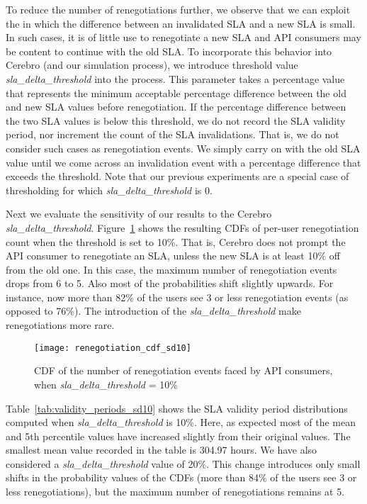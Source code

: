 To reduce the number of renegotiations further, we observe that we can exploit the
in which the difference between an invalidated SLA
and a new SLA is small.  In such cases, it is of little use to renegotiate 
a new SLA and API consumers may be content to continue with the old SLA.
To incorporate this behavior into Cerebro (and our simulation process), we introduce threshold
value \textit{sla\_delta\_threshold} into the process. This parameter takes a percentage value that
represents the minimum acceptable percentage difference between the old and new SLA 
values before renegotiation.
If the percentage difference between the two SLA values is below this threshold, we do not record the
SLA validity period, nor increment the count of the SLA invalidations. That is, we do not consider
such cases as renegotiation events. We simply carry on with the
old SLA value until we come across an invalidation event with a percentage difference
that exceeds the threshold. 
Note that our previous experiments are 
a special case of thresholding for which \textit{sla\_delta\_threshold} is 0.

Next we evaluate the sensitivity of our results to the Cerebro \textit{sla\_delta\_threshold}.
Figure~\ref{fig:renegotiation_cdf_sd10}
shows the resulting CDFs of per-user renegotiation count when the threshold is set to 10\%. That is, Cerebro does not prompt the API consumer to renegotiate an SLA, unless the new SLA is at 
least 10\% off from the old one. In this case, the
maximum number of renegotiation events drops from 6 to 5.
Also most of the probabilities shift slightly upwards. For instance,
now more than 82\% of the users see 3 or less renegotiation events (as opposed to 76\%). The
introduction of the \textit{sla\_delta\_threshold} make renegotiations more rare.

\begin{figure}
\centering
\texttt{[image: renegotiation\_cdf\_sd10]}
\caption{CDF of the number of renegotiation events faced by API consumers, when  \textit{sla\_delta\_threshold} = 10\%}
\label{fig:renegotiation_cdf_sd10}
\vspace{-0.1in}
\end{figure}

Table~\ref{tab:validity_periods_sd10} shows the SLA validity period distributions computed
when  \textit{sla\_delta\_threshold} is 10\%. Here, as expected  most of the mean and 5th
percentile values have increased slightly from their original values. The smallest mean value
recorded in the table is 304.97 hours. 
We have also considered a \textit{sla\_delta\_threshold} value of 20\%. This change
introduces only small shifts in the probability values of 
the CDFs (more than 84\% of the users see 3 or less renegotiations), 
but the maximum number of renegotiations remains at 5.

